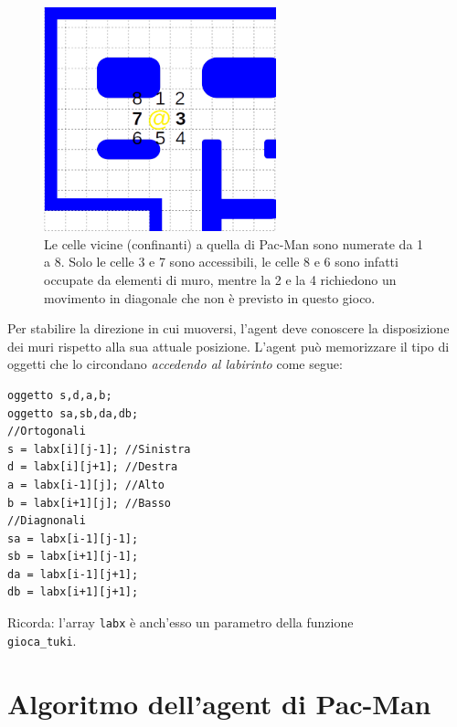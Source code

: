 \documentclass[8pt]{book}
\begin{document}
\begin{figure}
  \centering
  \includegraphics[width=0.6\textwidth]{img/labPac1.png}
  \caption{Le celle vicine (confinanti) a quella di Pac-Man sono numerate da 1 a 8. Solo le celle 3 e 7 sono accessibili, le celle 8 e 6 sono infatti occupate da elementi di muro, mentre la 2 e la 4 richiedono un movimento in diagonale che non è previsto in questo gioco.}
  \label{confinanti}
\end{figure}

Per stabilire la direzione in cui muoversi, l'agent deve conoscere la disposizione dei muri rispetto alla sua attuale posizione. L'agent può memorizzare il tipo di oggetti che lo circondano \emph{accedendo al labirinto} come segue: 


  \begin{spacing}{0.9}
    \begin{small}
      \begin{tcolorbox}
\begin{verbatim}
oggetto s,d,a,b;
oggetto sa,sb,da,db;
//Ortogonali
s = labx[i][j-1]; //Sinistra
d = labx[i][j+1]; //Destra
a = labx[i-1][j]; //Alto
b = labx[i+1][j]; //Basso
//Diagnonali
sa = labx[i-1][j-1]; 
sb = labx[i+1][j-1]; 
da = labx[i-1][j+1]; 
db = labx[i+1][j+1];
\end{verbatim}
\end{tcolorbox}
    \end{small}
  \end{spacing}


\textsf{Ricorda: l'array} \texttt{labx} \textsf{è anch'esso un parametro della funzione} \\\texttt{gioca\_tuki}.\\

\section{Algoritmo dell'agent di Pac-Man}
\end{document}

